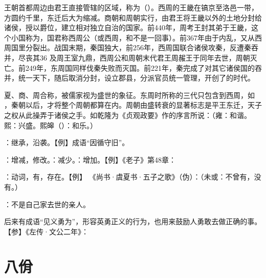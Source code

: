 {
王朝首都周边由君王直接管辖的区域，称为（）。西周的王畿在镐京至洛邑一带，方圆约千里，东迁后大为缩减。商朝和周朝实行，由君王将王畿以外的土地分封给诸侯，授以爵位，建立相对独立自治的国家。前440年，周考王封其弟于王畿，这个小国称为，国君称西周公（或西周，和不是一回事）。前367年由于内乱，又从西周国里分裂出。战国末期，秦国独大，前256年，西周国联合诸侯攻秦，反遭秦吞并，尽丧其36 及周王室九鼎，西周公和周朝末代君王周赧王于同年去世，周朝灭亡。前249年，东周国同样伐秦失败而灭国。前221年，秦完成了对其它诸侯国的吞并，统一天下，随后取消分封，设立郡县，分派官员统一管理，开创了的时代。

夏、商、周合称，被儒家视为盛世的象征。东周时所称的三代只包含到西周，如 ，秦朝以后，才将整个周朝都算在内。周朝由盛转衰的显著标志是平王东迁，天子之权从此操弄于诸侯之手。如乾隆为《贞观政要》作的序言所说：（雍：和谐。熙：兴盛。熙皞（）：和乐。）

\item {}：继承，沿袭。【例】成语“因循守旧”。

\item {}：增减，修改。：减少。：增加。【例】《老子》第48章：

\item {}：动词，有，存在。【例】 《尚书·虞夏书·五子之歌》（伪）：（未或：不曾有，没有。）
}
{}  %


{
\item {}：不是自己家去世的亲人。
\item {}后来有成语“见义勇为”，形容英勇正义的行为，也用来鼓励人勇敢去做正确的事。【参】《左传·文公二年》：
}
{}



\chapter{八佾}

